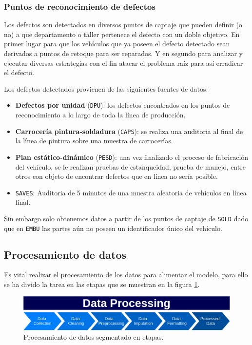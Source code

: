 \documentclass[a4paper,12pt]{article}
\begin{document}
\subsubsection{Puntos de reconocimiento de defectos} \label{ptocptj}
Los defectos son detectados en diversos puntos de captaje que pueden definir (o no) a que departamento o taller pertenece el defecto con un doble objetivo. En primer lugar para que los vehículos que ya poseen el defecto detectado sean derivados a puntos de retoque para ser reparados. Y en segundo para analizar y ejecutar diversas estrategias con el fin atacar el problema raíz para así erradicar el defecto.

Los defectos detectados provienen de las siguientes fuentes de datos:
\begin{itemize}[noitemsep, topsep=2pt]
	\item \textbf{Defectos por unidad} (\texttt{DPU}): los defectos encontrados en los puntos de reconocimiento a lo largo de toda la línea de producción.
	\item \textbf{Carrocería pintura-soldadura} (\texttt{CAPS}): se realiza una auditoria al final de la línea de pintura sobre una muestra de carrocerías.
	\item \textbf{Plan estático-dinámico} (\texttt{PESD}): una vez finalizado el proceso de fabricación del vehículo, se le realizan pruebas de estanqueidad, prueba de manejo, entre otros con objeto de encontrar defectos que en línea no sería posible.
	\item \texttt{SAVES}: Auditoria de 5 minutos de una muestra aleatoria de vehículos en línea final.
\end{itemize}

Sin embargo solo obtenemos datos a partir de los puntos de captaje de \texttt{SOLD} dado que en \texttt{EMBU} las partes aún no poseen un identificador único del vehículo.

\subsection{Procesamiento de datos}

Es vital realizar el procesamiento de los datos para alimentar el modelo, para ello se ha divido la tarea en las etapas que se muestran en la figura \ref{fig:dataproc}.

\begin{figure}[H]
	\begin{center}				
	\includegraphics[width=1\textwidth]{dataproc.png}
  	\caption{Procesamiento de datos segmentado en etapas.}
  	\label{fig:dataproc}
  	\end{center}
\end{figure}
\end{document}
